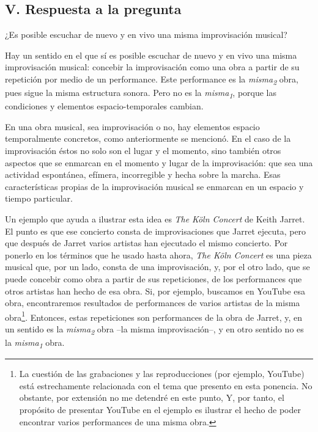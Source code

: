 \documentclass[]{book}
\begin{document}
\begin{refsection}
\section*{V. Respuesta a la pregunta}

¿Es posible escuchar de nuevo y en vivo una misma improvisación musical?

Hay un sentido en el que sí es posible escuchar de nuevo y en vivo una
misma improvisación musical: concebir la improvisación como una obra a
partir \protect\hypertarget{_Hlk508741672}{}{}de su repetición por medio
de un performance. Este performance es la \emph{misma\textsubscript{2}}
obra, pues sigue la misma estructura sonora. Pero no es la
\emph{misma\textsubscript{1}}, porque las condiciones y elementos
espacio-temporales cambian.

En una obra musical, sea improvisación o no, hay elementos espacio
temporalmente concretos, como anteriormente se mencionó. En el caso de
la improvisación éstos no solo son el lugar y el momento, sino también
otros aspectos que se enmarcan en el momento y lugar de la
improvisación: que sea una actividad espontánea, efímera, incorregible y
hecha sobre la marcha. Esas características propias de la improvisación
musical se enmarcan en un espacio y tiempo particular.

Un ejemplo que ayuda a ilustrar esta idea es \emph{The} \emph{Köln
Concert} de Keith Jarret. El punto es que ese concierto consta de
improvisaciones que Jarret ejecuta, pero que después de Jarret varios
artistas han ejecutado el mismo concierto. Por ponerlo en los términos
que he usado hasta ahora, \emph{The Köln Concert} es una pieza musical
que, por un lado, consta de una improvisación, y, por el otro lado, que
se puede concebir como obra a partir de sus repeticiones, de los
performances que otros artistas han hecho de esa obra. Si, por ejemplo,
buscamos en YouTube esa obra, encontraremos resultados de performances
de varios artistas de la misma obra\footnote{La cuestión de las
  grabaciones y las reproducciones (por ejemplo, YouTube) está
  estrechamente relacionada con el tema que presento en esta ponencia.
  No obstante, por extensión no me detendré en este punto, Y, por tanto,
  el propósito de presentar YouTube en el ejemplo es ilustrar el hecho
  de poder encontrar varios performances de una misma obra.}. Entonces,
estas repeticiones son performances de la obra de Jarret, y, en un
sentido es la \emph{misma\textsubscript{2}} obra --la misma
improvisación--, y en otro sentido no es la
\emph{misma\textsubscript{1}} obra.


\end{refsection}
\end{document}
